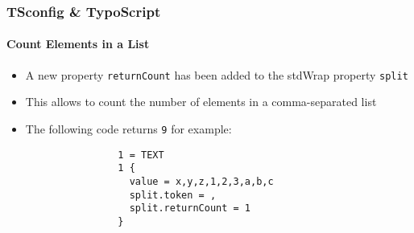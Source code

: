 \begin{frame}[fragile]
	\frametitle{TSconfig \& TypoScript}
	\framesubtitle{Count Elements in a List}

	\lstset{basicstyle=\tiny\ttfamily}

	\begin{itemize}

		\item A new property \texttt{returnCount} has been added to the stdWrap property \texttt{split}

		\item This allows to count the number of elements in a comma-separated list

		\item The following code returns \texttt{9} for example:

			\begin{lstlisting}
				1 = TEXT
				1 {
				  value = x,y,z,1,2,3,a,b,c
				  split.token = ,
				  split.returnCount = 1
				}
			\end{lstlisting}

	\end{itemize}

\end{frame}

